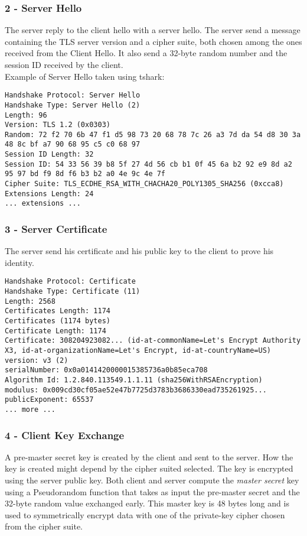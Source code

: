 \subsubsection{2 - Server Hello}
The server reply to the client hello with a server hello. The server send a message containing the TLS server version and a cipher suite, both chosen among the ones received from the Client Hello. It also send a 32-byte random number and the session ID received by the client.\\
Example of Server Hello taken using tshark:
\begin{lstlisting}
Handshake Protocol: Server Hello
Handshake Type: Server Hello (2)
Length: 96
Version: TLS 1.2 (0x0303)
Random: 72 f2 70 6b 47 f1 d5 98 73 20 68 78 7c 26 a3 7d da 54 d8 30 3a 48 8c bf a7 90 68 95 c5 c0 68 97
Session ID Length: 32
Session ID: 54 33 56 39 b8 5f 27 4d 56 cb b1 0f 45 6a b2 92 e9 8d a2 95 97 bd f9 8d f6 b3 b2 a0 4e 9c 4e 7f
Cipher Suite: TLS_ECDHE_RSA_WITH_CHACHA20_POLY1305_SHA256 (0xcca8)
Extensions Length: 24
... extensions ...
\end{lstlisting}

\subsubsection{3 - Server Certificate}
The server send his certificate and his public key to the client to prove his identity.\\
\begin{lstlisting}
Handshake Protocol: Certificate
Handshake Type: Certificate (11)
Length: 2568
Certificates Length: 1174
Certificates (1174 bytes)
Certificate Length: 1174
Certificate: 308204923082... (id-at-commonName=Let's Encrypt Authority X3, id-at-organizationName=Let's Encrypt, id-at-countryName=US)
version: v3 (2)
serialNumber: 0x0a0141420000015385736a0b85eca708
Algorithm Id: 1.2.840.113549.1.1.11 (sha256WithRSAEncryption)
modulus: 0x009cd30cf05ae52e47b7725d3783b3686330ead735261925...
publicExponent: 65537
... more ...
\end{lstlisting}

\subsubsection{4 - Client Key Exchange}
A pre-master secret key is created by the client and sent to the server. How the key is created might depend by the cipher suited selected. The key is encrypted using the server public key. Both client and server compute the \emph{master secret} key using a Pseudorandom function that takes as input the pre-master secret and the 32-byte random value exchanged early. This master key is 48 bytes long and is used to symmetrically encrypt data with one of the private-key cipher chosen from the cipher suite.

